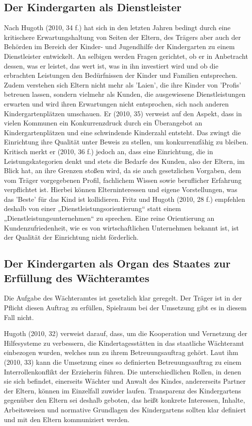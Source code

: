 \subsection{Der Kindergarten als Dienstleister}
Nach Hugoth (2010, 34 f.) hat sich in den letzten Jahren bedingt durch eine kritischere Erwartungshaltung von Seiten der Eltern, des Trägers aber auch der Behörden im Bereich der Kinder- und Jugendhilfe der Kindergarten zu einem Dienstleister entwickelt. An selbigen werden  Fragen gerichtet, ob er in Anbetracht dessen, was er leistet, das wert ist, was in ihn investiert wird und ob die erbrachten Leistungen den Bedürfnissen der Kinder und Familien entsprechen. Zudem verstehen sich Eltern nicht mehr als 'Laien', die ihre Kinder von 'Profis' betreuen lassen, sondern vielmehr als Kunden, die ausgewiesene Dienstleistungen erwarten und wird ihren Erwartungen nicht entsprochen, sich nach anderen Kindergartenplätzen umschauen. Er (2010, 35) verweist auf den Aspekt, dass in vielen Kommunen ein Konkurrenzdruck durch ein Überangebot an Kindergartenplätzen und eine schwindende Kinderzahl entsteht. Das zwingt die Einrichtung ihre Qualität unter Beweis zu stellen, um konkurrenzfähig zu bleiben. 
Kritisch merkt er (2010, 36 f.) jedoch an, dass eine Einrichtung, die in Leistungskategorien denkt und stets die Bedarfe des Kunden, also der Eltern, im Blick hat, an ihre Grenzen stoßen wird, da sie auch gesetzlichen Vorgaben, dem vom Träger vorgegebenen Profil, fachlichem Wissen sowie beruflicher Erfahrung verpflichtet ist. Hierbei können Elterninteressen und eigene Vorstellungen, was das 'Beste' für das Kind ist kollidieren. Fritz und Hugoth (2010, 28 f.) empfehlen deshalb von einer „Dienstleistungsorientierung“ statt einem „Dienstleistungsunternehmen“ zu sprechen. Eine reine Orientierung an Kundenzufriedenheit, wie es von wirtschaftlichen Unternehmen bekannt ist, ist der Qualität der Einrichtung nicht förderlich. 

\subsection{Der Kindergarten als Organ des Staates zur Erfüllung des Wächteramtes}
Die Aufgabe des Wächteramtes ist gesetzlich klar geregelt. Der Träger ist in der Pflicht diesen Auftrag zu erfüllen, Spielraum bei der Umsetzung gibt es in diesem Fall nicht.
 
Hugoth (2010, 32) verweist darauf, dass, um die Kooperation und Vernetzung der Hilfesysteme zu verbessern, die Kindertagesstätten in das staatliche Wächteramt einbezogen wurden, welches nun zu ihrem Betreuungsauftrag gehört. Laut ihm (2010, 33) kann die Umsetzung eines so definierten Betreuungsauftrag zu einem Interrollenkonflikt der Erzieherin führen. Die unterschiedlichen Rollen, in denen sie sich befindet, einerseits Wächter und Anwalt des Kindes, andererseits Partner der Eltern, können im Einzelfall zuwider laufen. Transparenz des Kindergartens gegenüber den Eltern sei deshalb geboten, das heißt konkrete Interessen, Inhalte, Arbeitsweisen und normative Grundlagen des Kindergartens sollten klar definiert und mit den Eltern kommuniziert werden.

